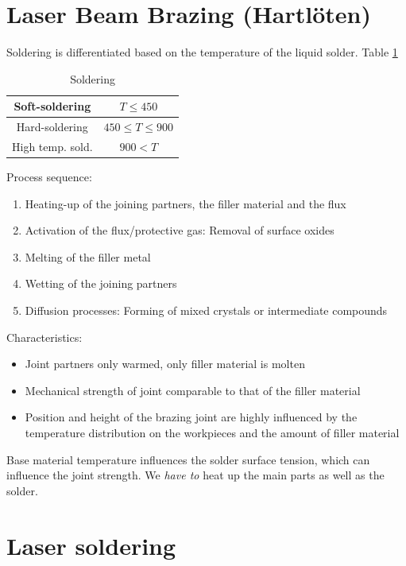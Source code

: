 \section{Laser Beam Brazing (Hartlöten)}

Soldering is differentiated based on the temperature of the liquid solder. Table \ref{tab:soldering}
\begin{table}[h!]
    \centering
    \begin{tabular}{|c|c|}
        \hline
        Soft-soldering &$ T \le 450$ \\
        \hline
        Hard-soldering &  $450\le T \le 900$\\
        \hline
        High temp. sold. & $ 900  < T$ \\
        \hline
    \end{tabular}
    \caption{Soldering}
    \label{tab:soldering}
\end{table} 

Process sequence:
\begin{enumerate}
    \item Heating-up of the joining partners, the filler material and the flux
    \item Activation of the flux/protective gas: Removal of surface oxides
    \item Melting of the filler metal
    \item Wetting of the joining partners
    \item Diffusion processes: Forming of mixed crystals or intermediate compounds
\end{enumerate}

Characteristics:
\begin{itemize}
    \item Joint partners only warmed, only filler material is molten
    \item Mechanical strength of joint comparable to that of the filler material
    \item Position and height of the brazing joint are highly influenced by the temperature distribution on the workpieces and the amount of filler material
\end{itemize}

Base material temperature influences the solder surface tension, which can influence the joint strength. 
We \textit{have to} heat up the main parts as well as the solder.

\section{Laser soldering}

